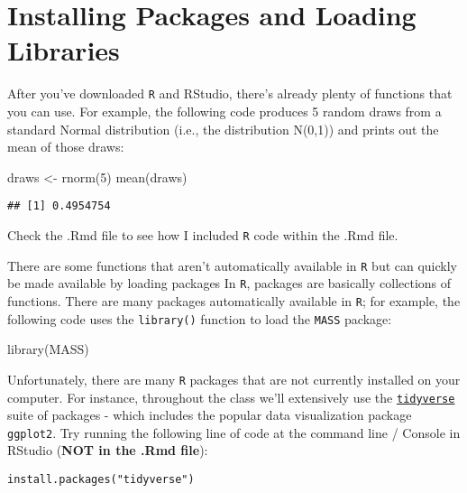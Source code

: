\documentclass[
]{article}
\newenvironment{Shaded}{\begin{snugshade}}{\end{snugshade}}
\newcommand{\DecValTok}[1]{\textcolor[rgb]{0.00,0.00,0.81}{#1}}
\newcommand{\FunctionTok}[1]{\textcolor[rgb]{0.00,0.00,0.00}{#1}}
\newcommand{\NormalTok}[1]{#1}
\newcommand{\OtherTok}[1]{\textcolor[rgb]{0.56,0.35,0.01}{#1}}
\begin{document}
\hypertarget{installing-packages-and-loading-libraries}{%
\section{Installing Packages and Loading
Libraries}\label{installing-packages-and-loading-libraries}}

After you've downloaded \texttt{R} and RStudio, there's already plenty
of functions that you can use. For example, the following code produces
5 random draws from a standard Normal distribution (i.e., the
distribution N(0,1)) and prints out the mean of those draws:

\begin{Shaded}
\begin{Highlighting}[]
\NormalTok{draws }\OtherTok{\textless{}{-}} \FunctionTok{rnorm}\NormalTok{(}\DecValTok{5}\NormalTok{)}
\FunctionTok{mean}\NormalTok{(draws)}
\end{Highlighting}
\end{Shaded}

\begin{verbatim}
## [1] 0.4954754
\end{verbatim}

Check the .Rmd file to see how I included \texttt{R} code within the
.Rmd file.

There are some functions that aren't automatically available in
\texttt{R} but can quickly be made available by loading packages In
\texttt{R}, packages are basically collections of functions. There are
many packages automatically available in \texttt{R}; for example, the
following code uses the \texttt{library()} function to load the
\texttt{MASS} package:

\begin{Shaded}
\begin{Highlighting}[]
\FunctionTok{library}\NormalTok{(MASS)}
\end{Highlighting}
\end{Shaded}

Unfortunately, there are many \texttt{R} packages that are not currently
installed on your computer. For instance, throughout the class we'll
extensively use the
\href{https://www.tidyverse.org/}{\texttt{tidyverse}} suite of packages
- which includes the popular data visualization package
\texttt{ggplot2}. Try running the following line of code at the command
line / Console in RStudio (\textbf{NOT in the .Rmd file}):

\texttt{install.packages("tidyverse")}
\end{document}
